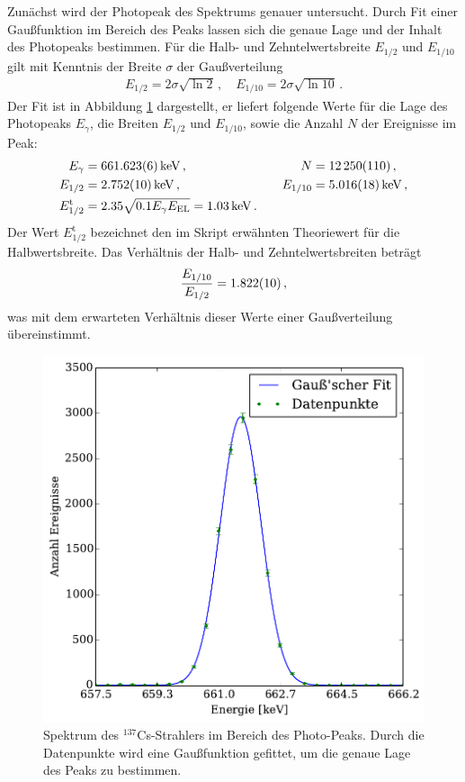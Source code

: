 Zunächst wird der Photopeak des Spektrums genauer untersucht. Durch Fit einer
Gaußfunktion im Bereich des Peaks lassen sich die genaue Lage und der Inhalt
des Photopeaks bestimmen.
Für die Halb- und Zehntelwertsbreite $E_{1/2}$ und $E_{1/10}$ gilt mit Kenntnis
der Breite $\sigma$ der Gaußverteilung
\begin{align*}
    E_{1/2} = 2\sigma\sqrt{\ln 2}\,,\quad E_{1/10} = 2\sigma\sqrt{\ln 10}\,.
\end{align*}
Der Fit ist in Abbildung \ref{fig:cs_gauss} dargestellt, er liefert folgende
Werte für die Lage des Photopeaks $E_\gamma$, die Breiten $E_{1/2}$ und
$E_{1/10}$, sowie die Anzahl $N$ der Ereignisse im Peak:
\begin{align*}
    E_\gamma &= \SI{661.623+-0.006}{keV} \,,&\quad N &= \num{12250+-110}\,,\\
    E_{1/2} &= \SI{2.752+-0.010}{keV}\,,&\quad E_{1/10} &= \SI{5.016+-0.018}{keV}\,,\\
    E_{1/2}^\text{t} &= \num{2.35} \sqrt{\num{0.1} E_\gamma E_\text{EL}} = \SI{1.03+-0.00}{keV}\,.
\end{align*}
Der Wert $E_{1/2}^\text{t}$ bezeichnet den im Skript erwähnten Theoriewert
für die Halbwertsbreite.
Das Verhältnis der Halb- und Zehntelwertsbreiten beträgt
\begin{align*}
    \frac{E_{1/10}}{E_{1/2}} = \num{1.822+-0.010}\,,
\end{align*}
was mit dem erwarteten Verhältnis dieser Werte einer Gaußverteilung
übereinstimmt.
\begin{figure}
    \centering
    \includegraphics[width=0.7\linewidth]{img/06_caesium_fit.pdf}
    \caption{
        Spektrum des $^{137}$Cs-Strahlers im Bereich des Photo-Peaks. Durch
        die Datenpunkte wird eine Gaußfunktion gefittet, um die genaue Lage
        des Peaks zu bestimmen.
    }
    \label{fig:cs_gauss}
\end{figure}

